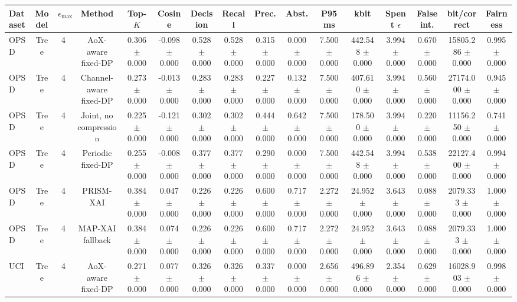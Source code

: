 \begin{tabular}{lccccccccccccccc}
\toprule
Dataset & Model & $\epsilon_{\max}$ & Method & Top-$K$ & Cosine & Decision & Recall & Prec. & Abst. & P95 ms & kbit & Spent $\epsilon$ & False int. & bit/correct & Fairness \\
\midrule
OPSD & Tree & 4 & AoX-aware fixed-DP & 0.306 $\pm$ 0.000 & -0.098 $\pm$ 0.000 & 0.528 $\pm$ 0.000 & 0.528 $\pm$ 0.000 & 0.315 $\pm$ 0.000 & 0.000 $\pm$ 0.000 & 7.500 $\pm$ 0.000 & 442.548 $\pm$ 0.000 & 3.994 $\pm$ 0.000 & 0.670 $\pm$ 0.000 & 15805.286 $\pm$ 0.000 & 0.995 $\pm$ 0.000 \\
OPSD & Tree & 4 & Channel-aware fixed-DP & 0.273 $\pm$ 0.000 & -0.013 $\pm$ 0.000 & 0.283 $\pm$ 0.000 & 0.283 $\pm$ 0.000 & 0.227 $\pm$ 0.000 & 0.132 $\pm$ 0.000 & 7.500 $\pm$ 0.000 & 407.610 $\pm$ 0.000 & 3.994 $\pm$ 0.000 & 0.560 $\pm$ 0.000 & 27174.000 $\pm$ 0.000 & 0.945 $\pm$ 0.000 \\
OPSD & Tree & 4 & Joint, no compression & 0.225 $\pm$ 0.000 & -0.121 $\pm$ 0.000 & 0.302 $\pm$ 0.000 & 0.302 $\pm$ 0.000 & 0.444 $\pm$ 0.000 & 0.642 $\pm$ 0.000 & 7.500 $\pm$ 0.000 & 178.500 $\pm$ 0.000 & 3.994 $\pm$ 0.000 & 0.220 $\pm$ 0.000 & 11156.250 $\pm$ 0.000 & 0.741 $\pm$ 0.000 \\
OPSD & Tree & 4 & Periodic fixed-DP & 0.255 $\pm$ 0.000 & -0.008 $\pm$ 0.000 & 0.377 $\pm$ 0.000 & 0.377 $\pm$ 0.000 & 0.290 $\pm$ 0.000 & 0.000 $\pm$ 0.000 & 7.500 $\pm$ 0.000 & 442.548 $\pm$ 0.000 & 3.994 $\pm$ 0.000 & 0.538 $\pm$ 0.000 & 22127.400 $\pm$ 0.000 & 0.994 $\pm$ 0.000 \\
OPSD & Tree & 4 & PRISM-XAI & 0.384 $\pm$ 0.000 & 0.047 $\pm$ 0.000 & 0.226 $\pm$ 0.000 & 0.226 $\pm$ 0.000 & 0.600 $\pm$ 0.000 & 0.717 $\pm$ 0.000 & 2.272 $\pm$ 0.000 & 24.952 $\pm$ 0.000 & 3.643 $\pm$ 0.000 & 0.088 $\pm$ 0.000 & 2079.333 $\pm$ 0.000 & 1.000 $\pm$ 0.000 \\
OPSD & Tree & 4 & MAP-XAI fallback & 0.384 $\pm$ 0.000 & 0.074 $\pm$ 0.000 & 0.226 $\pm$ 0.000 & 0.226 $\pm$ 0.000 & 0.600 $\pm$ 0.000 & 0.717 $\pm$ 0.000 & 2.272 $\pm$ 0.000 & 24.952 $\pm$ 0.000 & 3.643 $\pm$ 0.000 & 0.088 $\pm$ 0.000 & 2079.333 $\pm$ 0.000 & 1.000 $\pm$ 0.000 \\
UCI & Tree & 4 & AoX-aware fixed-DP & 0.271 $\pm$ 0.000 & 0.077 $\pm$ 0.000 & 0.326 $\pm$ 0.000 & 0.326 $\pm$ 0.000 & 0.337 $\pm$ 0.000 & 0.000 $\pm$ 0.000 & 2.656 $\pm$ 0.000 & 496.896 $\pm$ 0.000 & 2.354 $\pm$ 0.000 & 0.629 $\pm$ 0.000 & 16028.903 $\pm$ 0.000 & 0.998 $\pm$ 0.000 \\

\end{tabular}
